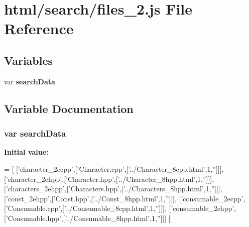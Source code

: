 \section{html/search/files\-\_\-2.js File Reference}
\label{files__2_8js}
\subsection*{Variables}
\begin{DoxyCompactItemize}
\item 
var {\bf search\-Data}
\end{DoxyCompactItemize}


\subsection{Variable Documentation}
\subsubsection[{search\-Data}]{\setlength{\rightskip}{0pt plus 5cm}var search\-Data}\label{files__2_8js_ad01a7523f103d6242ef9b0451861231e}
{\bfseries Initial value\-:}
\begin{DoxyCode}
=
[
  [\textcolor{stringliteral}{'character\_2ecpp'},[\textcolor{stringliteral}{'Character.cpp'},[\textcolor{stringliteral}{'../Character\_8cpp.html'},1,\textcolor{stringliteral}{''}]]],
  [\textcolor{stringliteral}{'character\_2ehpp'},[\textcolor{stringliteral}{'Character.hpp'},[\textcolor{stringliteral}{'../Character\_8hpp.html'},1,\textcolor{stringliteral}{''}]]],
  [\textcolor{stringliteral}{'characters\_2ehpp'},[\textcolor{stringliteral}{'Characters.hpp'},[\textcolor{stringliteral}{'../Characters\_8hpp.html'},1,\textcolor{stringliteral}{''}]]],
  [\textcolor{stringliteral}{'const\_2ehpp'},[\textcolor{stringliteral}{'Const.hpp'},[\textcolor{stringliteral}{'../Const\_8hpp.html'},1,\textcolor{stringliteral}{''}]]],
  [\textcolor{stringliteral}{'consumable\_2ecpp'},[\textcolor{stringliteral}{'Consumable.cpp'},[\textcolor{stringliteral}{'../Consumable\_8cpp.html'},1,\textcolor{stringliteral}{''}]]],
  [\textcolor{stringliteral}{'consumable\_2ehpp'},[\textcolor{stringliteral}{'Consumable.hpp'},[\textcolor{stringliteral}{'../Consumable\_8hpp.html'},1,\textcolor{stringliteral}{''}]]]
]
\end{DoxyCode}
